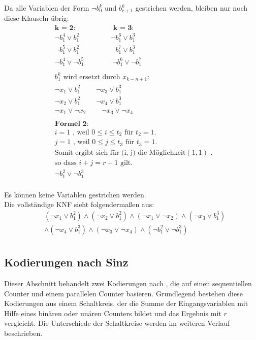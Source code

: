 \documentclass[a4,abstract=on]{scrartcl}
\begin{document}
Da alle Variablen der Form $\neg b_0^k$ und $b_{r+1}^k$  gestrichen werden, bleiben nur noch diese Klauseln übrig:\\
\begin{align*}
&\textbf{k = 2:} {~~~~~~~~~~~~~~~~~~~~~~~~} \textbf{k = 3:}\\
&\neg b_1^4  \vee b_1^2 {~~~~~~~~~~~~~~~~~~~~}\neg b_1^6 \vee b_1^3\\
&\neg b_1^5 \vee b_1^2  {~~~~~~~~~~~~~~~~~~~~}\neg b_1^7 \vee b_1^3\\
&\neg b_1^4 \vee \neg b_1^5 {~~~~~~~~~~~~~~~~~~}\neg b_1^6 \vee \neg b_1^7\\
\\
&b_1^k \text{ wird ersetzt durch } x_{k-n+1}:\\
&\neg x_1 \vee b_1^2 {~~~~~~~~~~} \neg x_3 \vee b_1^3\\
&\neg x_2 \vee b_1^2 {~~~~~~~~~~} \neg x_4 \vee b_1^3\\
&\neg x_1 \vee \neg x_2 {~~~~~~~~~~} \neg x_3 \vee \neg x_4\\
\\
&\textbf{Formel 2:}\\
&i=1 \text{ , weil } 0\leq i \leq t_2 \text{ für } t_2 = 1.\\
&j=1 \text{ , weil } 0\leq j \leq t_3 \text{ für } t_3=1.\\
&\text{Somit ergibt sich für (i, j) die Möglichkeit} (1,1) \text{ , }\\
&\text{so dass } i+j = r+1 \text{  gilt.}\\
&\neg b_1^2 \vee \neg b_1^3\\
\end{align*}

Es können keine Variablen gestrichen werden.\\

Die vollständige KNF sieht folgendermaßen aus:\\
\begin{align*}
&(\neg x_1 \vee b_1^2) \wedge (\neg x_2 \vee b_1^2) \wedge (\neg x_1 \vee \neg x_2) \wedge (\neg x_3 \vee b_1^3)\\
&\wedge (\neg x_4 \vee b_1^3) \wedge (\neg x_3 \vee \neg x_4) \wedge (\neg b_1^2 \vee \neg b_1^3)\\
\end{align*}

	\subsection{Kodierungen nach Sinz}
Dieser Abschnitt behandelt zwei Kodierungen nach \cite[][]{sinz}, die auf einen sequentiellen Counter und einem parallelen Counter basieren. Grundlegend bestehen diese Kodierungen aus einem Schaltkreis, der die Summe der Eingangsvariablen mit Hilfe eines binären oder unären Counters bildet und das Ergebnis mit $r$ vergleicht. Die Unterschiede der Schaltkreise werden im weiteren Verlauf beschrieben.
\end{document}
